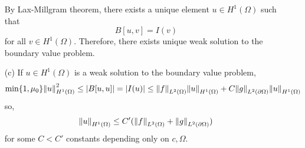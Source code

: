 \documentclass{article}
\begin{document}
\begin{enumerate}
By Lax-Millgram theorem, there exists a unique element $u\in H^1(\Omega)$ such that
\begin{equation*}
B[u,v]=I(v)
\end{equation*}
for all $v\in H^1(\Omega)$. Therefore, there exists unique weak solution to the boundary value problem.
\item[(c)] If $u\in H^1(\Omega)$ is a weak solution to the boundary value problem,
\begin{equation*}
\min\{1,\mu_0\}\norm{u}^2_{H^1(\Omega)}\leq \abs{B[u,u]}=\abs{I(u)}\leq \norm{f}_{L^2(\Omega)}\norm{u}_{H^1(\Omega)}+C\norm{g}_{L^2(\partial \Omega)}\norm{u}_{H^1(\Omega)}
\end{equation*}
so,
\begin{equation*}
\norm{u}_{H^1(\Omega)}\leq C'(\norm{f}_{L^2(\Omega)}+\norm{g}_{L^2(\partial \Omega)})
\end{equation*}
for some $C<C'$ constants depending only on $c,\Omega$.
\end{enumerate}
\end{document}
